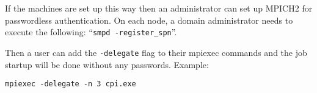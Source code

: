 \documentclass[dvipdfm,11pt]{article}
\begin{document}
If the machines are set up this way then an administrator can set up MPICH2 for passwordless
authentication.  On each node, a domain administrator needs to execute the following:
``\texttt{smpd -register\_spn}''.

Then a user can add the \texttt{-delegate} flag to their mpiexec commands and the job startup 
will be done without any passwords.  Example:
\begin{verbatim}
mpiexec -delegate -n 3 cpi.exe
\end{verbatim}
\end{document}
